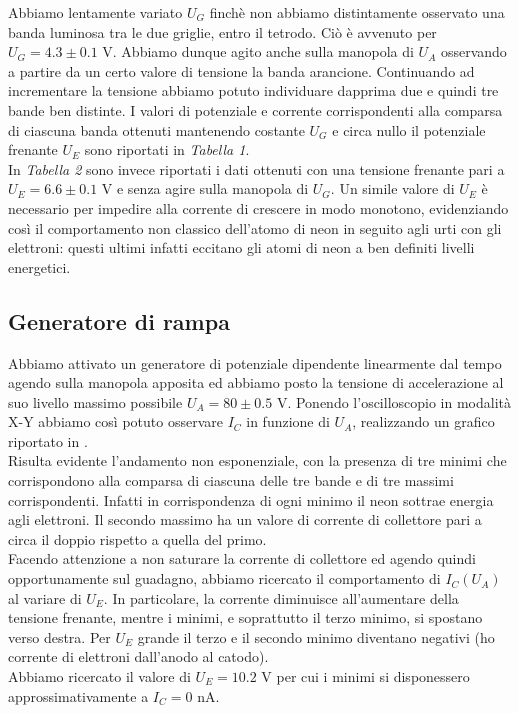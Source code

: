 Abbiamo lentamente variato $U_G$ finchè non abbiamo distintamente osservato una banda luminosa tra le due griglie, entro il tetrodo. Ciò è avvenuto per $U_G = 4.3 \pm 0.1$ V. Abbiamo dunque agito anche sulla manopola di $U_A$ osservando a partire da un certo valore di tensione la banda arancione. Continuando ad incrementare la tensione abbiamo potuto individuare dapprima due e quindi tre bande ben distinte.  I valori di potenziale e corrente corrispondenti alla comparsa di ciascuna banda ottenuti mantenendo costante $U_G$ e circa nullo il potenziale frenante $U_E$ sono riportati in \emph{Tabella 1}.\\
In \emph{Tabella 2} sono invece riportati i dati ottenuti con una tensione frenante pari a $U_E = 6.6 \pm 0.1$ V e senza agire sulla manopola di $U_G$. Un simile valore di $U_E$ è necessario per impedire alla corrente di crescere in modo monotono, evidenziando così il comportamento non classico dell'atomo di neon in seguito agli urti con gli elettroni: questi ultimi infatti eccitano gli atomi di neon a ben definiti livelli energetici.\\

\subsection{Generatore di rampa}

Abbiamo attivato un generatore di potenziale dipendente linearmente dal tempo agendo sulla manopola apposita ed abbiamo posto la tensione di accelerazione al suo livello massimo possibile $U_A = 80 \pm 0.5$ V. Ponendo l'oscilloscopio in modalità X-Y abbiamo così potuto osservare $I_C$ in funzione di $U_A$, realizzando un grafico riportato in . \\
Risulta evidente l'andamento non esponenziale, con la presenza di tre minimi che corrispondono alla comparsa di ciascuna delle tre bande e di tre massimi corrispondenti. Infatti in corrispondenza di ogni minimo il neon sottrae energia agli elettroni. Il secondo massimo ha un valore di corrente di collettore pari a circa il doppio rispetto a quella del primo.\\
Facendo attenzione a non saturare la corrente di collettore ed agendo quindi opportunamente sul guadagno, abbiamo ricercato il comportamento di $I_C(U_A)$ al variare di $U_E$. In particolare, la corrente diminuisce all'aumentare della tensione frenante, mentre i minimi, e soprattutto il terzo minimo, si spostano verso destra. Per $U_E$ grande il terzo e il secondo minimo diventano negativi (ho corrente di elettroni dall'anodo al catodo).\\
Abbiamo ricercato il valore di $U_E = 10.2$ V per cui i minimi si disponessero approssimativamente a $I_C = 0$ nA.
